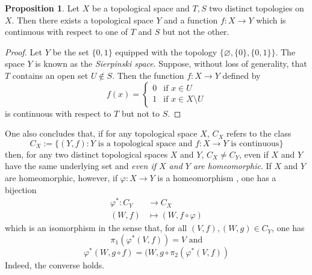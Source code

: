 \documentclass{book}
\theoremstyle{definition}
\newtheorem{proposition}{Proposition}[section]
\theoremstyle{remark}
\begin{document}
\begin{proposition}
\label{topdeterminesbycts}
Let $X$ be a topological space and $T,S$ two distinct topologies on $X$. Then there exists a topological space $Y$ and a function $f:X\to Y$ which is continuous with respect to one of $T$ and $S$ but not the other.
\end{proposition}
\begin{proof}
Let $Y$ be the set $\{0,1\}$ equipped with the topology $\{\varnothing, \{0\},\{0,1\}\}$. The space $Y$ is known as the \textit{Sierpinski space}. Suppose, without loss of generality, that $T$ contains an open set $U\notin S$. Then the function $f:X\to Y$ defined by
$$f(x)=\begin{cases}0 & \text{if }x\in U\\1 & \text{if }x\in X\setminus U\end{cases}$$
is continuous with respect to $T$ but not to $S$.
\end{proof}

One also concludes that, if for any topological space $X$, $C_X$ refers to the class
$$C_X:=\{(Y,f):Y\text{ is a topological space and }f:X\to Y\text{ is continuous}\}$$
then, for any two distinct topological spaces $X$ and $Y$, $C_X\neq C_Y$, even if $X$ and $Y$ have the same underlying set and \textit{even if $X$ and $Y$ are homeomorphic}. If $X$ and $Y$ are homeomorphic, however, if $\varphi:X\to Y$ is a homeomorphism , one has a bijection
\begin{align*}
    \varphi^*:C_Y&\to C_X\\
    (W,f)&\mapsto(W,f\circ\varphi)
\end{align*}
which is an isomorphism in the sense that, for all $(V,f),(W,g)\in C_Y$, one has
\begin{equation}
\label{contclassm1}
    \pi_1(\varphi^*(V,f))=V\text{ and}
\end{equation}
\begin{equation}
\label{contclassm2}
    \varphi^*(W, g\circ f)=(W,g\circ \pi_2(\varphi^*(V,f))
\end{equation}
Indeed, the converse holds.
\end{document}
